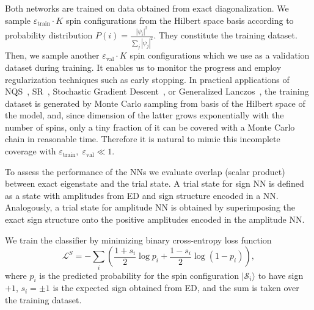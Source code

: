 Both networks are trained on data obtained from exact diagonalization. We sample $\varepsilon_\text{train} \cdot K$ spin configurations from the Hilbert space basis according to probability distribution $P(i) = \frac{|\psi_i|^2}{\sum_j |\psi_j|^2}$. They constitute the training dataset.%
Then, we sample another $\varepsilon_\text{val} \cdot K$ spin configurations which we use as a validation dataset during training. It enables us to monitor the progress and employ regularization techniques such as early stopping. In practical applications of NQS~\cite{Carleo, Choo, Liang}, SR~\cite{casula2004correlated,sorella2007weak}, Stochastic Gradient Descent~\cite{harju1997stochastic,saito2017machine}, or Generalized Lanczos~\cite{sorella2001generalized}, the training dataset is generated by Monte Carlo sampling from basis of the Hilbert space of the model, and, since dimension of the latter grows exponentially with the number of spins, only a tiny fraction of it can be covered with a Monte Carlo chain in reasonable time. Therefore it is natural to mimic this incomplete coverage with $\varepsilon_{\text{train}},\; \varepsilon_{\text{val}} \ll 1$.

To assess the performance of the NNs we evaluate overlap (scalar product) between exact eigenstate and the trial state. A trial state for sign NN is defined as a state with amplitudes from ED and sign structure encoded in a NN. Analogously, a trial state for amplitude NN is obtained by superimposing the exact sign structure onto the positive amplitudes encoded in the amplitude NN.

We train the classifier by minimizing binary cross-entropy loss function
\begin{equation}\label{eq:cross-entropy}
    \mathcal{L}^{S} = 
        -\sum\limits_{i} \left(\frac{1 + s_i}{2} \log p_i + \frac{1 - s_i}{2} \log (1 - p_i) \right),
\end{equation}
where $p_i$ is the predicted probability for the spin configuration $|\mathcal{S}_i\rangle$ to have sign $+1$, $s_i = \pm 1$ is the expected sign obtained from ED, and the sum is taken over the training dataset.

